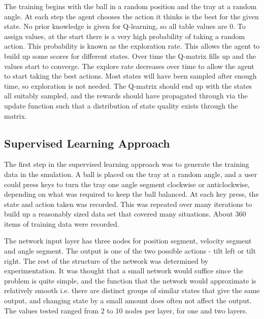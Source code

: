 \documentclass[12pt,a4paper]{article}
\begin{document}
The training begins with the ball in a random position and the tray at a random angle. At each step the agent chooses the action it thinks is the best for the given state. No prior knowledge is given for Q-learning, so all table values are 0. To assign values, at the start there is a very high probability of taking a random action. This probability is known as the exploration rate. This allows the agent to build up some scores for different states. Over time the Q-matrix fills up and the values start to converge. The explore rate decreases over time to allow the agent to start taking the best actions. Most states will have been sampled after enough time, so exploration is not needed. The Q-matrix should end up with the states all suitably sampled, and the rewards should have propagated through via the update function such that a distribution of state quality exists through the matrix.

\subsection{Supervised Learning Approach}
The first step in the supervised learning approach was to generate the training data in the smulation. A ball is placed on the tray at a random angle, and a user could press keys to turn the tray one angle segment clockwise or anticlockwise, depending on what was required to keep the ball balanced. At each key press, the state and action taken was recorded. This was repeated over many iterations to build up a reasonably sized data set that covered many situations. About 360 items of training data were recorded.

The network input layer has three nodes for position segment, velocity segment and angle segment. The output is one of the two possible actions - tilt left or tilt right. The rest of the structure of the network was determined by experimentation. It was thought that a small network would suffice since the problem is quite simple, and the function that the network would approximate is relatively smooth i.e. there are distinct groups of similar states that give the same output, and changing state by a small amount does often not affect the output. The values tested ranged from 2 to 10 nodes per layer, for one and two layers. 
\end{document}
